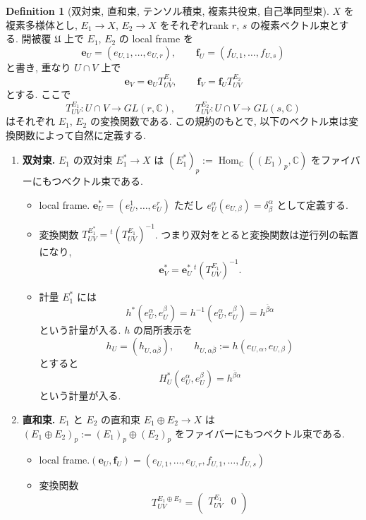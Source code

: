 \documentclass[dvipdfmx,a4paper,11pt]{article} %
\theoremstyle{definition}
\newtheorem{defn}[thm]{Definition}
\theoremstyle{remark}
\numberwithin{equation}{section}
\begin{document}
\begin{defn}[双対束, 直和束, テンソル積束, 複素共役束, 自己準同型束]
\(X\) を複素多様体とし, \(E_1\to X\), \(E_2\to X\) をそれぞれrank \(r\), \(s\) の複素ベクトル束とする. 開被覆 \(\mathfrak{U}\) 上で \(E_1\), \(E_2\) の local frame を
\[
\mathbf{e}_U=(e_{U,1},\ldots,e_{U,r}),\qquad \mathbf{f}_U=(f_{U,1},\ldots,f_{U,s})
\]
と書き, 重なり \(U\cap V\) 上で
\[
\mathbf{e}_V=\mathbf{e}_U T^{E_1}_{UV},\qquad \mathbf{f}_V=\mathbf{f}_U T^{E_2}_{UV}
\]
とする. ここで
\[
T^{E_1}_{UV}\colon U\cap V\to GL(r,\mathbb{C}),\qquad T^{E_2}_{UV}\colon U\cap V\to GL(s,\mathbb{C})
\]
はそれぞれ \(E_1\), \(E_2\) の変換関数である.
この規約のもとで, 以下のベクトル束は変換関数によって自然に定義する.
\begin{enumerate}
\item \textbf{双対束.} \(E_1\) の双対束 \(E_1^*\to X\) は
\(
(E_1^*)_p:=\operatorname{Hom}_{\mathbb{C}}((E_1)_p,\mathbb{C})
\)
をファイバーにもつベクトル束である.
\begin{itemize}
\item local frame. \(
\mathbf{e}_U^*=(e_U^1,\ldots,e_U^r)\) ただし \(e_U^\alpha(e_{U,\beta})=\delta^\alpha_\beta
\) として定義する.
\item 変換関数 \(
T^{E_1^*}_{UV}={}^t(T^{E_1}_{UV})^{-1}
\). つまり双対をとると変換関数は逆行列の転置になり,
\[
\mathbf{e}_V^*=\mathbf{e}_U^*\,{}^t(T^{E_1}_{UV})^{-1}.
\]
\item 計量 \(E_1^{*}\) には
\[
h^{*}(e_U^\alpha, e_U^\beta)=h^{-1}(e_U^\alpha, e_U^\beta)
=h^{\overline{\beta}\alpha}
\]
という計量が入る. \(h\) の局所表示を
\[
h_U=(h_{U,\alpha\overline{\beta}}),\qquad h_{U,\alpha\overline{\beta}}:=h(e_{U,\alpha},e_{U,\beta})
\]
とすると
\[
H^{*}_U (e_U^\alpha, e_U^\beta)
= h^{\overline{\beta}\alpha}
\]
という計量が入る. 
\end{itemize}
\item \textbf{直和束.} \(E_1\) と \(E_2\) の直和束 \(E_1\oplus E_2\to X\) は
\(
(E_1\oplus E_2)_p:=(E_1)_p\oplus (E_2)_p
\)
をファイバーにもつベクトル束である.
\begin{itemize}
\item local frame.\(
(\mathbf{e}_U,\mathbf{f}_U)=(e_{U,1},\ldots,e_{U,r},f_{U,1},\ldots,f_{U,s})
\)
\item 変換関数
\[
T^{E_1\oplus E_2}_{UV}=
\begin{pmatrix}
T^{E_1}_{UV} & 0\\

\end{pmatrix}\]
\end{itemize}
\end{enumerate}
\end{defn}
\end{document}
